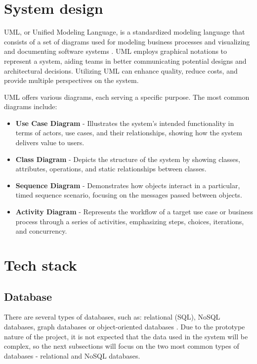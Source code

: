 \section{System design}

UML, or Unified Modeling Language, is a standardized modeling language that consists of a set of diagrams used for modeling business processes and visualizing and documenting software systems \parencite{uml}. UML employs graphical notations to represent a system, aiding teams in better communicating potential designs and architectural decisions. Utilizing UML can enhance quality, reduce costs, and provide multiple perspectives on the system.

UML offers various diagrams, each serving a specific purpose. The most common diagrams include:
\begin{itemize}
    \item \textbf{Use Case Diagram} - Illustrates the system's intended functionality in terms of actors, use cases, and their relationships, showing how the system delivers value to users.
    \item \textbf{Class Diagram} - Depicts the structure of the system by showing classes, attributes, operations, and static relationships between classes.
    \item \textbf{Sequence Diagram} - Demonstrates how objects interact in a particular, timed sequence scenario, focusing on the messages passed between objects.
    \item \textbf{Activity Diagram} - Represents the workflow of a target use case or business process through a series of activities, emphasizing steps, choices, iterations, and concurrency.
\end{itemize}

\section{Tech stack}

\subsection{Database}

There are several types of databases, such as: relational (SQL), NoSQL databases, graph databases or object-oriented databases \parencite{databases2}. Due to the prototype nature of the project, it is not expected that the data used in the system will be complex, so the next subsections will focus on the two most common types of databases - relational and NoSQL databases.

